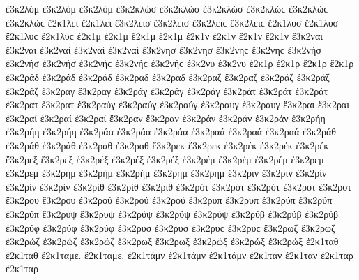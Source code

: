 {ἐ3κ2λόμ ἐ3κ2λόμ ἐ3κ2λόμ   %
ἐ3κ2κλώσ ἐ3κ2κλώσ ἐ3κ2κλώσ ἐ3κ2κλώϲ ἐ3κ2κλώϲ ἐ3κ2κλώϲ   %
ἔ2κ1λει ἔ2κ1λει   %
ἔ3κ2λεισ ἔ3κ2λεισ ἔ3κ2λειϲ ἔ3κ2λειϲ   %
ἔ2κ1λυσ ἔ2κ1λυσ ἔ2κ1λυϲ ἔ2κ1λυϲ   %
ἐ2κ1μ ἐ2κ1μ 
ἔ2κ1μ ἔ2κ1μ 
ἐ2κ1ν ἐ2κ1ν 
ἔ2κ1ν ἔ2κ1ν 
ἔ3κ2ναι ἔ3κ2ναι   %
ἐ3κ2ναί ἐ3κ2ναί ἐ3κ2ναί   %
ἔ3κ2νησ ἔ3κ2νησ ἔ3κ2νηϲ ἔ3κ2νηϲ   %
ἐ3κ2νήσ ἐ3κ2νήσ ἐ3κ2νήσ ἐ3κ2νήϲ ἐ3κ2νήϲ ἐ3κ2νήϲ   %
ἐ3κ2νυ ἐ3κ2νυ   %
ἐ2κ1ρ ἐ2κ1ρ 
ἔ2κ1ρ ἔ2κ1ρ 
ἐ3κ2ράδ ἐ3κ2ράδ ἐ3κ2ράδ   %
ἐ3κ2ραδ ἐ3κ2ραδ 
ἔ3κ2ραζ ἔ3κ2ραζ   %
ἐ3κ2ράζ ἐ3κ2ράζ ἐ3κ2ράζ 
ἔ3κ2ραγ ἔ3κ2ραγ   %
ἐ3κ2ράγ ἐ3κ2ράγ ἐ3κ2ράγ 
ἐ3κ2ράτ ἐ3κ2ράτ ἐ3κ2ράτ   %
ἐ3κ2ρατ ἐ3κ2ρατ 
ἐ3κ2ραύγ ἐ3κ2ραύγ ἐ3κ2ραύγ   %
ἐ3κ2ραυγ ἐ3κ2ραυγ 
ἔ3κ2ραι ἔ3κ2ραι   %
ἐ3κ2ραί ἐ3κ2ραί ἐ3κ2ραί 
ἔ3κ2ραν ἔ3κ2ραν   %
ἐ3κ2ράν ἐ3κ2ράν ἐ3κ2ράν 
ἐ3κ2ρήη ἐ3κ2ρήη ἐ3κ2ρήη   %
ἐ3κ2ράα ἐ3κ2ράα ἐ3κ2ράα 
ἐ3κ2ραά ἐ3κ2ραά ἐ3κ2ραά 
ἐ3κ2ράθ ἐ3κ2ράθ ἐ3κ2ράθ   %
ἐ3κ2ραθ ἐ3κ2ραθ 
ἔ3κ2ρεκ ἔ3κ2ρεκ   %
ἐ3κ2ρέκ ἐ3κ2ρέκ ἐ3κ2ρέκ 
ἔ3κ2ρεξ ἔ3κ2ρεξ   %
ἐ3κ2ρέξ ἐ3κ2ρέξ ἐ3κ2ρέξ 
ἐ3κ2ρέμ ἐ3κ2ρέμ ἐ3κ2ρέμ   %
ἐ3κ2ρεμ ἐ3κ2ρεμ 
ἐ3κ2ρήμ ἐ3κ2ρήμ ἐ3κ2ρήμ   %
ἐ3κ2ρημ ἐ3κ2ρημ 
ἔ3κ2ριν ἔ3κ2ριν   %
ἐ3κ2ρίν ἐ3κ2ρίν ἐ3κ2ρίν 
ἐ3κ2ρίθ ἐ3κ2ρίθ ἐ3κ2ρίθ 
ἐ3κ2ρότ ἐ3κ2ρότ ἐ3κ2ρότ   %
ἐ3κ2ροτ ἐ3κ2ροτ 
ἔ3κ2ρου ἔ3κ2ρου   %
ἐ3κ2ρού ἐ3κ2ρού ἐ3κ2ρού 
ἔ3κ2ρυπ ἔ3κ2ρυπ   %
ἐ3κ2ρύπ ἐ3κ2ρύπ ἐ3κ2ρύπ   %
ἔ3κ2ρυψ ἔ3κ2ρυψ 
ἐ3κ2ρύψ ἐ3κ2ρύψ ἐ3κ2ρύψ 
ἐ3κ2ρύβ ἐ3κ2ρύβ ἐ3κ2ρύβ 
ἐ3κ2ρύφ ἐ3κ2ρύφ ἐ3κ2ρύφ 
ἐ3κ2ρυσ ἐ3κ2ρυσ ἐ3κ2ρυϲ ἐ3κ2ρυϲ   %
ἔ3κ2ρωζ ἔ3κ2ρωζ   %
ἐ3κ2ρώζ ἐ3κ2ρώζ ἐ3κ2ρώζ 
ἔ3κ2ρωξ ἔ3κ2ρωξ   %
ἐ3κ2ρώξ ἐ3κ2ρώξ ἐ3κ2ρώξ 
ἐ2κ1ταθ ἐ2κ1ταθ   %
ἔ2κ1ταμε. ἔ2κ1ταμε.   %
ἐ2κ1τάμν ἐ2κ1τάμν ἐ2κ1τάμν   %
ἐ2κ1ταν ἐ2κ1ταν   %
ἐ2κ1ταρ ἐ2κ1ταρ   %
}
